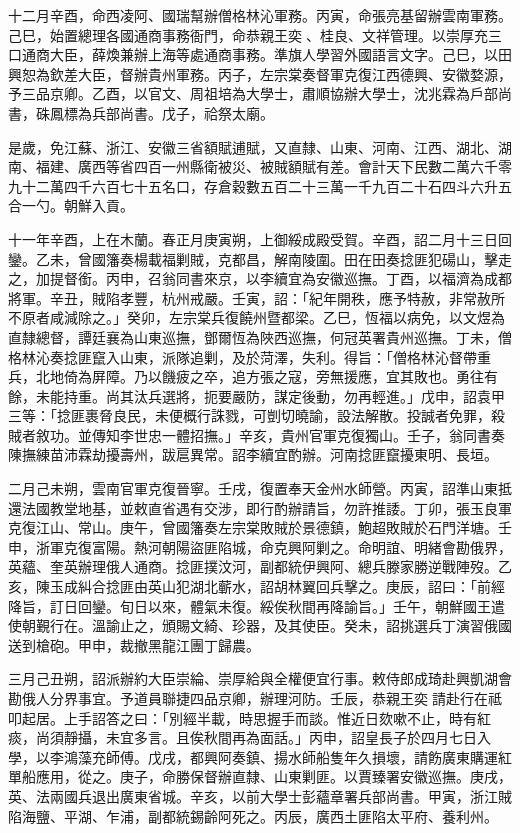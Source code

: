 \begin{pinyinscope}
十二月辛酉，命西凌阿、國瑞幫辦僧格林沁軍務。丙寅，命張亮基留辦雲南軍務。己巳，始置總理各國通商事務衙門，命恭親王奕、桂良、文祥管理。以崇厚充三口通商大臣，薛煥兼辦上海等處通商事務。準旗人學習外國語言文字。己巳，以田興恕為欽差大臣，督辦貴州軍務。丙子，左宗棠奏督軍克復江西德興、安徽婺源，予三品京卿。乙酉，以官文、周祖培為大學士，肅順協辦大學士，沈兆霖為戶部尚書，硃鳳標為兵部尚書。戊子，祫祭太廟。

是歲，免江蘇、浙江、安徽三省額賦逋賦，又直隸、山東、河南、江西、湖北、湖南、福建、廣西等省四百一州縣衛被災、被賊額賦有差。會計天下民數二萬六千零九十二萬四千六百七十五名口，存倉穀數五百二十三萬一千九百二十石四斗六升五合一勺。朝鮮入貢。

十一年辛酉，上在木蘭。春正月庚寅朔，上御綏成殿受賀。辛酉，詔二月十三日回鑾。乙未，曾國籓奏楊載福剿賊，克都昌，解南陵圍。田在田奏捻匪犯碭山，擊走之，加提督銜。丙申，召翁同書來京，以李續宜為安徽巡撫。丁酉，以福濟為成都將軍。辛丑，賊陷孝豐，杭州戒嚴。壬寅，詔：「紀年開秩，應予特赦，非常赦所不原者咸減除之。」癸卯，左宗棠兵復饒州暨都梁。乙巳，恆福以病免，以文煜為直隸總督，譚廷襄為山東巡撫，鄧爾恆為陜西巡撫，何冠英署貴州巡撫。丁未，僧格林沁奏捻匪竄入山東，派隊追剿，及於菏澤，失利。得旨：「僧格林沁督帶重兵，北地倚為屏障。乃以饑疲之卒，追方張之寇，旁無援應，宜其敗也。勇往有餘，未能持重。尚其汰兵選將，扼要嚴防，謀定後動，勿再輕進。」戊申，詔袁甲三等：「捻匪裹脅良民，未便概行誅戮，可剴切曉諭，設法解散。投誠者免罪，殺賊者敘功。並傳知李世忠一體招撫。」辛亥，貴州官軍克復獨山。壬子，翁同書奏陳撫練苗沛霖劫擾壽州，跋扈異常。詔李續宜酌辦。河南捻匪竄擾東明、長垣。

二月己未朔，雲南官軍克復晉寧。壬戌，復置奉天金州水師營。丙寅，詔準山東抵還法國教堂地基，並敕直省遇有交涉，即行酌辦請旨，勿許推諉。丁卯，張玉良軍克復江山、常山。庚午，曾國籓奏左宗棠敗賊於景德鎮，鮑超敗賊於石門洋塘。壬申，浙軍克復富陽。熱河朝陽盜匪陷城，命克興阿剿之。命明誼、明緒會勘俄界，英蘊、奎英辦理俄人通商。捻匪撲汶河，副都統伊興阿、總兵滕家勝逆戰陣歿。乙亥，陳玉成糾合捻匪由英山犯湖北蘄水，詔胡林翼回兵擊之。庚辰，詔曰：「前經降旨，訂日回鑾。旬日以來，體氣未復。綏俟秋間再降諭旨。」壬午，朝鮮國王遣使朝覲行在。溫諭止之，頒賜文綺、珍器，及其使臣。癸未，詔挑選兵丁演習俄國送到槍砲。甲申，裁撤黑龍江團丁歸農。

三月己丑朔，詔派辦約大臣崇綸、崇厚給與全權便宜行事。敕侍郎成琦赴興凱湖會勘俄人分界事宜。予道員聯捷四品京卿，辦理河防。壬辰，恭親王奕請赴行在祗叩起居。上手詔答之曰：「別經半載，時思握手而談。惟近日欬嗽不止，時有紅痰，尚須靜攝，未宜多言。且俟秋間再為面話。」丙申，詔皇長子於四月七日入學，以李鴻藻充師傅。戊戌，都興阿奏鎮、揚水師船隻年久損壞，請飭廣東購運紅單船應用，從之。庚子，命勝保督辦直隸、山東剿匪。以賈臻署安徽巡撫。庚戌，英、法兩國兵退出廣東省城。辛亥，以前大學士彭蘊章署兵部尚書。甲寅，浙江賊陷海鹽、平湖、乍浦，副都統錫齡阿死之。丙辰，廣西土匪陷太平府、養利州。


\end{pinyinscope}
